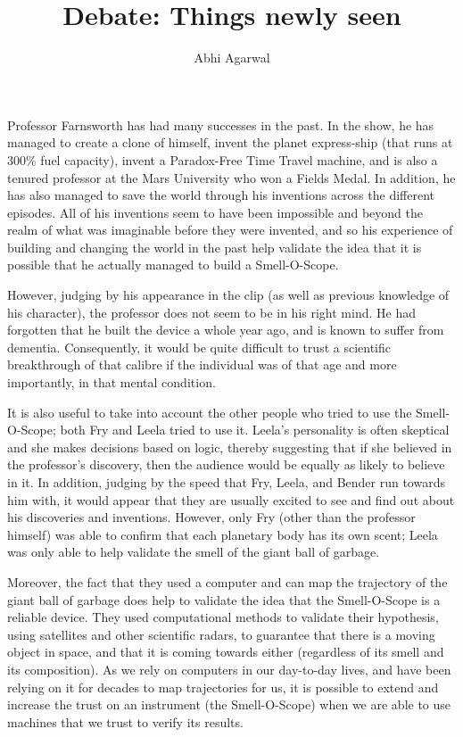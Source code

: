 \documentclass[11pt, oneside]{article}
\title{Debate: Things newly seen}
\author{Abhi Agarwal}
\date{}
\begin{document}
\maketitle

\par Professor Farnsworth has had many successes in the past. In the show, he has managed to create a clone of himself, invent the planet express-ship (that runs at 300\% fuel capacity), invent a Paradox-Free Time Travel machine, and is also a tenured professor at the Mars University who won a Fields Medal. In addition, he has also managed to save the world through his inventions across the different episodes. All of his inventions seem to have been impossible and beyond the realm of what was imaginable before they were invented, and so his experience of building and changing the world in the past help validate the idea that it is possible that he actually managed to build a Smell-O-Scope.

\par However, judging by his appearance in the clip (as well as previous knowledge of his character), the professor does not seem to be in his right mind. He had forgotten that he built the device a whole year ago, and is known to suffer from dementia. Consequently, it would be quite difficult to trust a scientific breakthrough of that calibre if the individual was of that age and more importantly, in that mental condition.

\par It is also useful to take into account the other people who tried to use the Smell-O-Scope; both Fry and Leela tried to use it. Leela's personality is often skeptical and she makes decisions based on logic, thereby suggesting that if she believed in the professor's discovery, then the audience would be equally as likely to believe in it. In addition, judging by the speed that Fry, Leela, and Bender run towards him with, it would appear that they are usually excited to see and find out about his discoveries and inventions. However, only Fry (other than the professor himself) was able to confirm that each planetary body has its own scent; Leela was only able to help validate the smell of the giant ball of garbage. 

\par Moreover, the fact that they used a computer and can map the trajectory of the giant ball of garbage does help to validate the idea that the Smell-O-Scope is a reliable device. They used computational methods to validate their hypothesis, using satellites and other scientific radars, to guarantee that there is a moving object in space, and that it is coming towards either (regardless of its smell and its composition). As we rely on computers in our day-to-day lives, and have been relying on it for decades to map trajectories for us, it is possible to extend and increase the trust on an instrument (the Smell-O-Scope) when we are able to use machines that we trust to verify its results.
\end{document}
